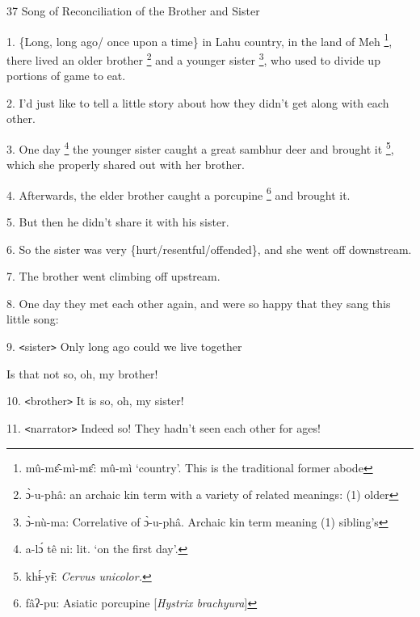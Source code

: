
37 Song of Reconciliation of the Brother and Sister

1. \{Long, long ago/ once upon a time\} in Lahu country, in the land of Meh \footnote{mû-mɛ̂-mì-mɛ̂: mû-mì `country'. This is the traditional former abode},
there lived an older brother \footnote{ɔ̀-u-phâ: an archaic kin term with a variety of related meanings: (1) older} and a younger sister \footnote{ɔ̀-nù-ma: Correlative of ɔ̀-u-phâ. Archaic kin term meaning (1) sibling's}, who used to divide up
portions of game to eat.

2. I'd just like to tell a little story about how they didn't get along with each
other.

3. One day \footnote{a-lɔ́ tê ni: lit. `on the first day'.} the younger sister caught a great sambhur deer and brought it \footnote{khɨ́-yɨ̄: \textit{Cervus unicolor.}},
which she properly shared out with her brother.

4. Afterwards, the elder brother caught a porcupine \footnote{fâʔ-pu: Asiatic porcupine [\textit{Hystrix brachyura}]} and brought it.

5. But then he didn't share it with his sister.

6. So the sister was very \{hurt/resentful/offended\}, and she went off downstream.

7. The brother went climbing off upstream.

8. One day they met each other again, and were so happy that they sang this little
song:

9. \texttt{<}sister\texttt{>} Only long ago could we live together

Is that not so, oh, my brother!

10. \texttt{<}brother\texttt{>} It is so, oh, my sister!

11. \texttt{<}narrator\texttt{>} Indeed so! They hadn't seen each other for ages!
